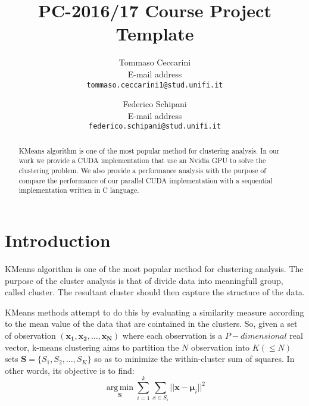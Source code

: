 \documentclass[10pt,twocolumn,letterpaper]{article}
\begin{document}
\title{PC-2016/17 Course Project Template}

\author{Tommaso Ceccarini \\
E-mail address\\
{\tt\small tommaso.ceccarini1@stud.unifi.it}
\and
Federico Schipani\\
E-mail address\\
{\tt\small federico.schipani@stud.unifi.it}
}

\maketitle
\thispagestyle{empty}

\begin{abstract}
   KMeans algorithm is one of the most popular method for clustering analysis.
   In our work we provide a CUDA implementation that use an Nvidia GPU to solve the clustering problem.
   We also provide a performance analysis with the purpose of compare the performance of our parallel CUDA implementation with a sequential implementation written in C language.
\end{abstract}

\section{Introduction}
KMeans algorithm is one of the most popular method for clustering analysis.
The purpose of the cluster analysis is that of divide data into meaningfull group, called cluster.
The resultant cluster should then capture the structure of the data.\par
KMeans methods attempt to do this by evaluating a similarity measure according to the mean value of
the data that are cointained in the clusters.
So, given a set of observation $(\boldsymbol{x_{1}}, \boldsymbol{x_{2}}, \dots,\boldsymbol{x_{N}} )$ where each observation is a $P-dimensional$ real vector, k-means clustering aims to partition the $N$ observation into $K (\leq N)$ sets $\boldsymbol{S} = \{S_{1}, S_{2}, \dots, S_{K}\}$ so as to minimize the within-cluster sum of squares. In other words, its objective is to find: 
\begin{equation}
\label{eq:first}
\operatorname*{arg\, min}_\boldsymbol{S} \displaystyle\sum_{i = 1}^{k} \displaystyle\sum_{x \in S_{i}} ||\boldsymbol{x} - \boldsymbol{\mu}_{i} ||^{2}
\end{equation}  \cite{wiki:kmeans}


\vspace{3cm}







\end{document}
